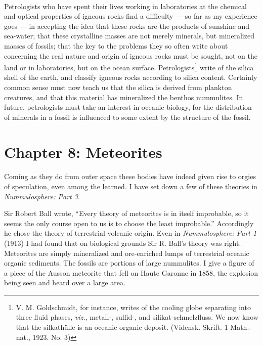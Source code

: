 \documentclass[a4paper, 12pt, oneside]{article}
\begin{document}
\paragraph{}
Petrologists who have spent their lives working in laboratories at the chemical and optical properties of igneous rocks find a difficulty --- so far as my experience goes --- in accepting the idea that these rocks are the products of sunshine and sea-water; that these crystalline masses are not merely minerals, but mineralized masses of fossils; that the key to the problems they so often write about concerning the real nature and origin of igneous rocks must be sought, not on the land or in laboratories, but on the ocean surface. Petrologists\footnote{V. M. Goldschmidt, for instance, writes of the cooling globe separating into three fluid phases, \emph{viz.}, metall-, sulfid-, and silikat-schmelzfluss. We now know that the silkathülle is an oceanic organic deposit. (Vidensk. Skrift. 1 Math.-nat., 1923. No. 3)} write of the silica shell of the earth, and classify igneous rocks according to silica content. Certainly common sense must now teach us that the silica is derived from plankton creatures, and that this material has mineralized the benthos nummulites. In future, petrologists must take an interest in oceanic biology, for the distribution of minerals in a fossil is influenced to some extent by the structure of the fossil.
\clearpage
\section{Chapter 8: Meteorites}
\paragraph{}
Coming as they do from outer space these bodies have indeed given rise to orgies of speculation, even among the learned. I have set down a few of these theories in \emph{Nummulosphere: Part 3}.

Sir Robert Ball wrote, ``Every theory of meteorites is in itself improbable, so it seems the only course open to us is to choose the least improbable.'' Accordingly he chose the theory of terrestrial volcanic origin. Even in \emph{Nummulosphere: Part 1} (1913) I had found that on biological grounds Sir R. Ball's theory was right. Meteorites are simply mineralized and ore-enriched lumps of terrestrial oceanic organic sediments. The fossils are portions of large nummulites. I give a figure of a piece of the Ausson meteorite that fell on Haute Garonne in 1858, the explosion being seen and heard over a large area.
\end{document}
